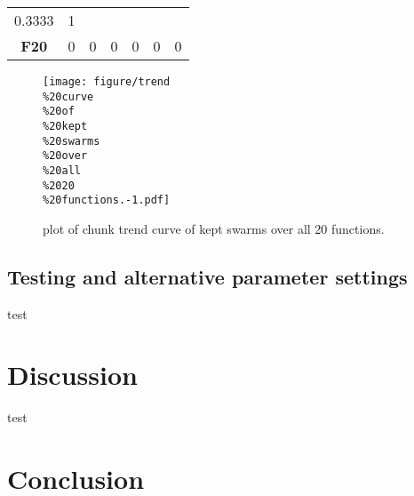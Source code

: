 \documentclass[12pt,a4paper]{article}
\begin{document}
\begin{longtable}[c]{@{}ccccccc@{}}
\begin{minipage}[t]{0.11\columnwidth}\centering\strut
0.3333
\strut\end{minipage} &
\begin{minipage}[t]{0.07\columnwidth}\centering\strut
1
\strut\end{minipage}\tabularnewline
\begin{minipage}[t]{0.11\columnwidth}\centering\strut
\textbf{F20}
\strut\end{minipage} &
\begin{minipage}[t]{0.09\columnwidth}\centering\strut
0
\strut\end{minipage} &
\begin{minipage}[t]{0.08\columnwidth}\centering\strut
0
\strut\end{minipage} &
\begin{minipage}[t]{0.09\columnwidth}\centering\strut
0
\strut\end{minipage} &
\begin{minipage}[t]{0.10\columnwidth}\centering\strut
0
\strut\end{minipage} &
\begin{minipage}[t]{0.11\columnwidth}\centering\strut
0
\strut\end{minipage} &
\begin{minipage}[t]{0.07\columnwidth}\centering\strut
0
\strut\end{minipage}\tabularnewline
\bottomrule
\end{longtable}

\begin{figure}[htbp]
\centering
\texttt{[image: figure/trend\\\%20curve\\\%20of\\\%20kept\\\%20swarms\\\%20over\\\%20all\\\%2020\\\%20functions.-1.pdf]}
\caption{plot of chunk trend curve of kept swarms over all 20
functions.}
\end{figure}

\subsection{Testing and alternative parameter
settings}\label{testing-and-alternative-parameter-settings}

test

\section{Discussion}\label{discussion}

test

\section{Conclusion}\label{conclusion}
\end{document}
